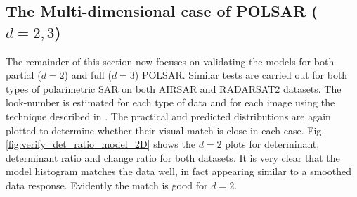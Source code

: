 \documentclass[journal]{IEEEtran}
\begin{document}
\subsection{The Multi-dimensional case of POLSAR ($d=2,3$)}

The remainder of this section now focuses on validating the models for both partial ($d=2$) and full ($d=3$) POLSAR.
Similar tests %
  are carried out
  for both types of polarimetric SAR
  on both AIRSAR and RADARSAT2 datasets.
The look-number is estimated for each type of data and for each image using the technique described in \cite{Anfinsen_2009_TGRS_3795}. %
The practical and predicted distributions are again plotted to determine whether their visual match is close in each case. Fig. \ref{fig:verify_det_ratio_model_2D} shows the $d=2$ plots for determinant, determinant ratio and change ratio for both datasets. It is very clear that the model histogram matches the data well, in fact appearing similar to a smoothed data response. Evidently the match is good for $d=2$.
\end{document}
